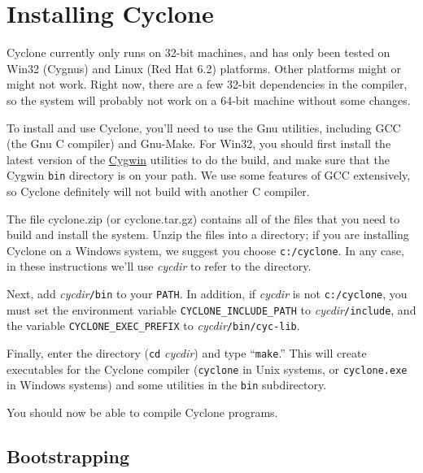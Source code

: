 \section{Installing Cyclone}
\label{sec:install}
Cyclone currently only runs on 32-bit machines, and has only been
tested on Win32 (Cygnus) and Linux (Red Hat 6.2) platforms.  Other
platforms might or might not work.  Right now, there are a few 32-bit
dependencies in the compiler, so the system will probably not work on
a 64-bit machine without some changes.

To install and use Cyclone, you'll need to use the Gnu utilities,
including GCC (the Gnu C compiler) and Gnu-Make.  For Win32, you
should first install the latest version of the
\href{http://cygwin.com/}{Cygwin} utilities to do the build, and make
sure that the Cygwin \texttt{bin} directory is on your path. We use
some features of GCC extensively, so Cyclone definitely will not build
with another C compiler.

The file cyclone.zip (or cyclone.tar.gz) contains all of the files
that you need to build and install the system.  Unzip the files into a
directory; if you are installing Cyclone on a Windows system, we
suggest you choose \texttt{c:/cyclone}.  In any case, in these
instructions we'll use \textit{cycdir} to refer to the directory.

Next, add \textit{cycdir}\texttt{/bin} to your \texttt{PATH}.  In
addition, if \textit{cycdir} is not \texttt{c:/cyclone}, you must set
the environment variable \texttt{CYCLONE_INCLUDE_PATH} to
\textit{cycdir}\texttt{/include}, and the variable
\texttt{CYCLONE_EXEC_PREFIX} to \textit{cycdir}\texttt{/bin/cyc-lib}.

Finally, enter the directory (\texttt{cd} \textit{cycdir}) and type
``\texttt{make}.''  This will create executables for the Cyclone
compiler (\texttt{cyclone} in Unix systems, or \texttt{cyclone.exe} in
Windows systems) and some utilities in the \texttt{bin} subdirectory.

You should now be able to compile Cyclone programs.

\subsection*{Bootstrapping}

